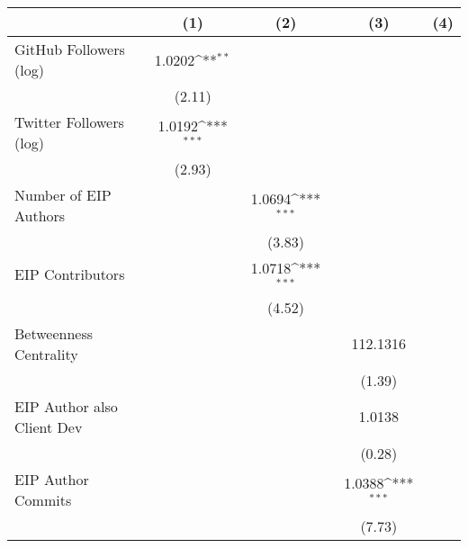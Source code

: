{
\def\sym#1{\ifmmode^{#1}\else\(^{#1}\)\fi}
\begin{tabular}{l*{4}{c}}
\hline\hline
                                   &\multicolumn{1}{c}{(1)}         &\multicolumn{1}{c}{(2)}         &\multicolumn{1}{c}{(3)}         &\multicolumn{1}{c}{(4)}         \\
\hline
GitHub Followers (log)             &      1.0202\sym{**} &                     &                     &                     \\
                                   &      (2.11)         &                     &                     &                     \\
[1em]
Twitter Followers (log)            &      1.0192\sym{***}&                     &                     &                     \\
                                   &      (2.93)         &                     &                     &                     \\
[1em]
Number of EIP Authors              &                     &      1.0694\sym{***}&                     &                     \\
                                   &                     &      (3.83)         &                     &                     \\
[1em]
EIP Contributors                   &                     &      1.0718\sym{***}&                     &                     \\
                                   &                     &      (4.52)         &                     &                     \\
[1em]
Betweenness Centrality             &                     &                     &    112.1316         &                     \\
                                   &                     &                     &      (1.39)         &                     \\
[1em]
EIP Author also Client Dev         &                     &                     &      1.0138         &                     \\
                                   &                     &                     &      (0.28)         &                     \\
[1em]
EIP Author Commits                 &                     &                     &      1.0388\sym{***}&                     \\
                                   &                     &                     &      (7.73)         &                     \\

\end{tabular}}
